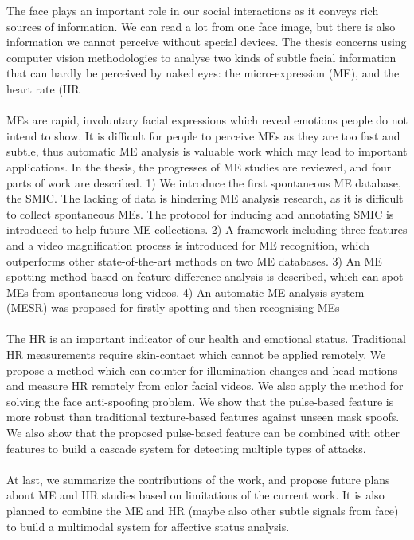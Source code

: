 \noindent
The face plays an important role in our social interactions as it conveys rich sources of information. We can read a lot from one face image, but there is also information we cannot perceive without special devices. The thesis concerns using computer vision methodologies to analyse two kinds of subtle facial information that can hardly be perceived by naked eyes: the micro-expression (ME), and the heart rate (HR\\
\\
MEs are rapid, involuntary facial expressions which reveal emotions people do not intend to show. It is difficult for people to perceive MEs as they are too fast and subtle, thus automatic ME analysis is valuable work which may lead to important applications. In the thesis, the progresses of ME studies are reviewed, and four parts of work are described. 1) We introduce the first spontaneous ME database, the SMIC. The lacking of data is hindering ME analysis research, as it is difficult to collect spontaneous MEs. The protocol for inducing and annotating SMIC is introduced to help future ME collections. 2) A framework including three features and a video magnification process is introduced for ME recognition, which outperforms other state-of-the-art methods on two ME databases. 3) An ME spotting method based on feature difference analysis is described, which can spot MEs from spontaneous long videos. 4) An automatic ME analysis system (MESR) was proposed for firstly spotting and then recognising MEs\\
\\
The HR is an important indicator of our health and emotional status. Traditional HR measurements require skin-contact which cannot be applied remotely. We propose a method which can counter for illumination changes and head motions and measure HR remotely from color facial videos. We also apply the method for solving the face anti-spoofing problem. We show that the pulse-based feature is more robust than traditional texture-based features against unseen mask spoofs. We also show that the proposed pulse-based feature can be combined with other features to build a cascade system for detecting multiple types of attacks.\\
\\
At last, we summarize the contributions of the work, and propose future plans about ME and HR studies based on limitations of the current work. It is also planned to combine the ME and HR (maybe also other subtle signals from face) to build a multimodal system for affective status analysis.\\

